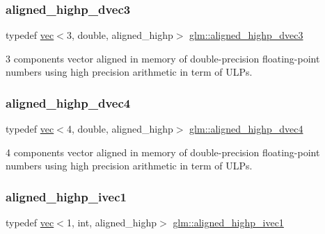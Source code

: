 \subsubsection{\texorpdfstring{aligned\+\_\+highp\+\_\+dvec3}{aligned\_highp\_dvec3}}
{\footnotesize\ttfamily typedef \mbox{\hyperlink{structglm_1_1vec}{vec}}$<$3, double, aligned\+\_\+highp$>$ \mbox{\hyperlink{group__gtc__type__aligned_gafb21f8db25007665c2cb2a9b250471aa}{glm\+::aligned\+\_\+highp\+\_\+dvec3}}}



3 components vector aligned in memory of double-\/precision floating-\/point numbers using high precision arithmetic in term of U\+L\+Ps. 

\mbox{\label{group__gtc__type__aligned_ga4b7b03b9178c6f0574c26181a054beec}} 
\subsubsection{\texorpdfstring{aligned\+\_\+highp\+\_\+dvec4}{aligned\_highp\_dvec4}}
{\footnotesize\ttfamily typedef \mbox{\hyperlink{structglm_1_1vec}{vec}}$<$4, double, aligned\+\_\+highp$>$ \mbox{\hyperlink{group__gtc__type__aligned_ga4b7b03b9178c6f0574c26181a054beec}{glm\+::aligned\+\_\+highp\+\_\+dvec4}}}



4 components vector aligned in memory of double-\/precision floating-\/point numbers using high precision arithmetic in term of U\+L\+Ps. 

\mbox{\label{group__gtc__type__aligned_ga90ebad7148156f223d4743091c9870d5}} 
\subsubsection{\texorpdfstring{aligned\+\_\+highp\+\_\+ivec1}{aligned\_highp\_ivec1}}
{\footnotesize\ttfamily typedef \mbox{\hyperlink{structglm_1_1vec}{vec}}$<$1, int, aligned\+\_\+highp$>$ \mbox{\hyperlink{group__gtc__type__aligned_ga90ebad7148156f223d4743091c9870d5}{glm\+::aligned\+\_\+highp\+\_\+ivec1}}}



